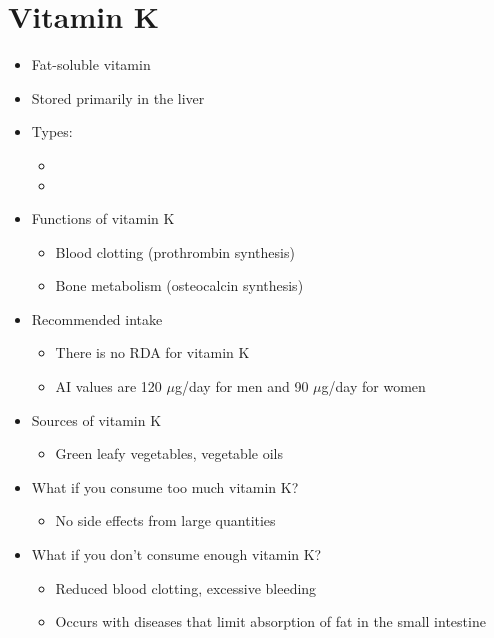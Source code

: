 \documentclass[title={Chapter 9}]{fdsn201notes}
\begin{document}
\section{Vitamin K}\label{sec:vitamin-k}
\begin{itemize}
	\item Fat-soluble vitamin
	\item Stored primarily in the liver
	\item Types:
	\begin{itemize}
		\item {}
		\item {}
	\end{itemize}
	\item Functions of vitamin K
	\begin{itemize}
		\item Blood clotting (prothrombin synthesis)
		\item Bone metabolism (osteocalcin synthesis)
	\end{itemize}
	\item Recommended intake
	\begin{itemize}
		\item There is no RDA for vitamin K
		\item AI values are 120 $\mu$g/day for men and 90 $\mu$g/day for women
	\end{itemize}
	\item Sources of vitamin K
	\begin{itemize}
		\item Green leafy vegetables, vegetable oils
	\end{itemize}
	\item What if you consume too much vitamin K?
	\begin{itemize}
		\item No side effects from large quantities
	\end{itemize}
	\item What if you don’t consume enough vitamin K?
	\begin{itemize}
		\item Reduced blood clotting, excessive bleeding
		\item Occurs with diseases that limit absorption of fat in the small intestine
	\end{itemize}
\end{itemize}
\end{document}
